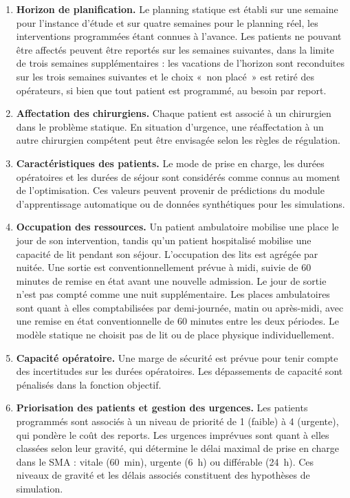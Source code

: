 \documentclass[11pt,a4paper]{article}
\begin{document}
\begin{enumerate}
    \item \textbf{Horizon de planification.}
    Le planning statique est établi sur une semaine pour l'instance d'étude et sur quatre semaines pour le planning réel, les interventions programmées étant connues à l'avance. Les patients ne pouvant être affectés peuvent être reportés sur les semaines suivantes, dans la limite de trois semaines supplémentaires : les vacations de l'horizon sont reconduites sur les trois semaines suivantes et le choix «~non placé~» est retiré des opérateurs, si bien que tout patient est programmé, au besoin par report.

    \item \textbf{Affectation des chirurgiens.}
    Chaque patient est associé à un chirurgien dans le problème statique. En situation d'urgence, une réaffectation à un autre chirurgien compétent peut être envisagée selon les règles de régulation.

    \item \textbf{Caractéristiques des patients.}
    Le mode de prise en charge, les durées opératoires et les durées de séjour sont considérés comme connus au moment de l'optimisation. Ces valeurs peuvent provenir de prédictions du module d'apprentissage automatique ou de données synthétiques pour les simulations.

    \item \textbf{Occupation des ressources.}
    Un patient ambulatoire mobilise une place le jour de son intervention, tandis qu'un patient hospitalisé mobilise une capacité de lit pendant son séjour. L'occupation des lits est agrégée par nuitée. Une sortie est conventionnellement prévue à midi, suivie de 60 minutes de remise en état avant une nouvelle admission. Le jour de sortie n'est pas compté comme une nuit supplémentaire. Les places ambulatoires sont quant à elles comptabilisées par demi-journée, matin ou après-midi, avec une remise en état conventionnelle de 60 minutes entre les deux périodes. Le modèle statique ne choisit pas de lit ou de place physique individuellement.

    \item \textbf{Capacité opératoire.}
    Une marge de sécurité est prévue pour tenir compte des incertitudes sur les durées opératoires. Les dépassements de capacité sont pénalisés dans la fonction objectif.

    \item \textbf{Priorisation des patients et gestion des urgences.}
    Les patients programmés sont associés à un niveau de priorité de 1 (faible) à 4 (urgente), qui pondère le coût des reports. Les urgences imprévues sont quant à elles classées selon leur gravité, qui détermine le délai maximal de prise en charge dans le SMA : vitale (60~min), urgente (6~h) ou différable (24~h). Ces niveaux de gravité et les délais associés constituent des hypothèses de simulation.
\end{enumerate}
\end{document}
